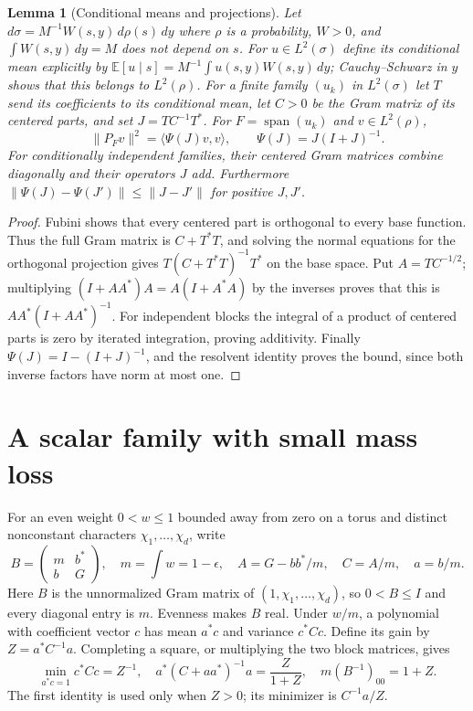 \documentclass[reqno,a4paper,12pt]{amsart}
\newtheorem{lemma}[theorem]{Lemma}
\newcommand{\E}{\mathbb E}
\newcommand{\spn}{\operatorname{span}}
\newcommand{\ip}[2]{\langle #1,#2\rangle}
\begin{document}
\begin{lemma}[Conditional means and projections]\label{information}
Let $d\sigma=M^{-1}W(s,y)\,d\rho(s)\,dy$ where $\rho$ is a probability,
$W>0$, and $\int W(s,y)\,dy=M$ does not depend on $s$.
For $u\in L^2(\sigma)$ define its conditional mean explicitly by
$\E[u\mid s]=M^{-1}\int u(s,y)W(s,y)\,dy$; Cauchy--Schwarz in $y$
shows that this belongs to $L^2(\rho)$.
For a finite family $(u_k)$ in $L^2(\sigma)$ let $T$ send its coefficients to its
conditional mean, let $C>0$ be the Gram matrix of its centered parts,
and set $J=TC^{-1}T^*$. For $F=\spn(u_k)$ and $v\in L^2(\rho)$,
\[
 \|P_Fv\|^2=\ip{\Psi(J)v}{v},\qquad \Psi(J)=J(I+J)^{-1}.
\]
For conditionally independent families, their centered Gram matrices
combine diagonally and their operators $J$ add. Furthermore
$\|\Psi(J)-\Psi(J')\|\le\|J-J'\|$ for positive $J,J'$.
\end{lemma}
\begin{proof}
Fubini shows that every centered part is orthogonal to every base function.
Thus the full Gram matrix is $C+T^*T$, and solving the normal equations
for the orthogonal projection gives
$T(C+T^*T)^{-1}T^*$ on the base space.
Put $A=TC^{-1/2}$; multiplying
$(I+AA^*)A=A(I+A^*A)$ by the inverses proves that this is
$AA^*(I+AA^*)^{-1}$. For independent blocks the integral of a product
of centered parts is zero by iterated integration, proving additivity.
Finally $\Psi(J)=I-(I+J)^{-1}$, and the resolvent identity proves the
bound, since both inverse factors have norm at most one.
\end{proof}

\section{A scalar family with small mass loss}
For an even weight $0<w\le1$ bounded away from zero on a torus and
distinct nonconstant characters $\chi_1,\ldots,\chi_d$, write
\[
 B=\begin{pmatrix}m&b^*\\b&G\end{pmatrix},\quad m=\int w=1-\epsilon,
 \quad A=G-bb^*/m,\quad C=A/m,\quad a=b/m.
\]
Here $B$ is the unnormalized Gram matrix of $(1,\chi_1,\ldots,\chi_d)$,
so $0<B\le I$ and every diagonal entry is $m$. Evenness makes $B$ real.
Under $w/m$, a polynomial with coefficient vector $c$ has mean $a^*c$
and variance $c^*Cc$. Define its gain by $Z=a^*C^{-1}a$.
Completing a square, or multiplying the two block matrices, gives
\begin{equation}\label{scalaridentities}
 \min_{a^*c=1}c^*Cc=Z^{-1},\quad
 a^*(C+aa^*)^{-1}a=\frac{Z}{1+Z},\quad m(B^{-1})_{00}=1+Z.
\end{equation}
The first identity is used only when $Z>0$; its minimizer is $C^{-1}a/Z$.
\end{document}
